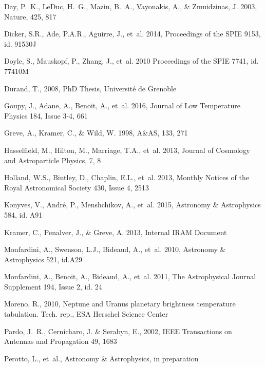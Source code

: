 \begin{thebibliography}{99}
Day, P.~K., LeDuc, H.~G., Mazin, B.~A., Vayonakis, A., \& Zmuidzinas, J. 2003,
Nature, 425, 817

Dicker, S.R., Ade, P.A.R., Aguirre, J., {et~al.} 2014,
Proceedings of the SPIE 9153, id. 91530J 

Doyle, S., Mauskopf, P., Zhang, J., {et~al.} 2010
Proceedings of the SPIE 7741, id. 77410M

Durand, T., 2008, 
PhD Thesis, Universit\' e de Grenoble

Goupy, J., Adane, A., Benoit, A., {et~al.} 2016, 
Journal of Low Temperature Physics 184, Issue 3-4, 661

Greve, A., Kramer, C., \& Wild, W. 1998, 
A\&AS, 133, 271

Hasselfield, M., Hilton, M., Marriage, T.A., {et~al.} 2013, 
Journal of Cosmology and Astroparticle Physics, 7, 8

Holland, W.S., Bintley, D., Chaplin, E.L., {et~al.} 2013, 
Monthly Notices of the Royal Astronomical Society 430, Issue 4, 2513

Konyves, V., Andr\'e, P., Menshchikov, A., {et~al.} 2015, 
Astronomy \& Astrophysics 584, id. A91

Kramer, C., Penalver, J., \& Greve, A. 2013, Internal IRAM Document

Monfardini, A., Swenson, L.J., Bideaud, A., {et~al.} 2010, 
Astronomy \& Astrophysics 521, id.A29

Monfardini, A., Benoit, A., Bideaud, A., {et~al.} 2011, 
The Astrophysical Journal Supplement 194, Issue 2, id. 24
 
Moreno, R., 2010, 
Neptune and Uranus planetary brightness temperature tabulation. Tech. rep., ESA Herschel Science Center

Pardo, J.~R., Cernicharo, J. \& Serabyn, E., 2002, 
IEEE Transactions on Antennas and Propagation 49, 1683
    
Perotto, L., {et~al.}, 
Astronomy \& Astrophysics, in preparation


\end{thebibliography}
